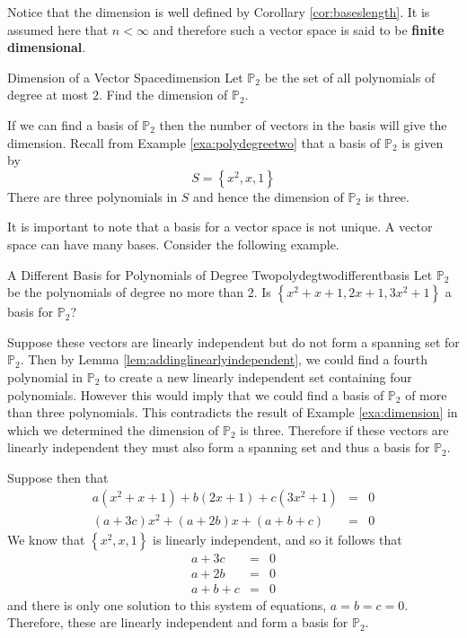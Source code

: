 Notice that the dimension is well defined by Corollary \ref{cor:baseslength}. It is assumed here
that $n<\infty $ and therefore such a vector space is said to be \textbf{finite
dimensional}.

\begin{example}{Dimension of a Vector Space}{dimension}
Let $\mathbb{P}_2$ be the set of all polynomials of degree at most $2$. Find the dimension of $\mathbb{P}_2$. 
\end{example}

\begin{solution}
If we can find a basis of $\mathbb{P}_2$ then the number of vectors in the basis will give the dimension. Recall from Example \ref{exa:polydegreetwo} that a basis of $\mathbb{P}_2$ is given by 
\[
S  = \left\{ x^2, x, 1 \right\}
\]
There are three polynomials in $S$ and hence the dimension of $\mathbb{P}_2$ is three. 
\end{solution}

It is important to note that a basis for a vector space is not unique. A vector space can have many bases. Consider the following example.

\begin{example}{A Different Basis for Polynomials of Degree Two}{polydegtwodifferentbasis}
Let $\mathbb{P}_2$ be the polynomials of degree no more than 2. Is $\left\{
x^{2}+x+1,2x+1,3x^{2}+1\right\} $ a basis for $\mathbb{P}_2$?
\end{example}

\begin{solution}
Suppose these vectors are linearly independent but do not form a spanning set for $\mathbb{P}_2$. Then by Lemma \ref{lem:addinglinearlyindependent}, we could find a fourth polynomial in $\mathbb{P}_2$ to create a new linearly independent 
set containing four polynomials. However this would imply that we could find a basis of $\mathbb{P}_2$ of more than three polynomials. This contradicts the result of Example \ref{exa:dimension} in which we determined the dimension of $\mathbb{P}_2$ is three.  Therefore if these vectors are linearly independent they must also form a spanning set and thus a basis for $\mathbb{P}_2$. 

Suppose then that 
\begin{eqnarray*}
a\left( x^{2}+x+1\right) +b\left( 2x+1\right) +c\left( 3x^{2}+1\right) &=& 0\\
\left( a+3c\right) x^{2}+\left( a+2b\right) x+\left( a+b+c\right) &=& 0 
\end{eqnarray*}
We know that $\left\{ x^2, x, 1 \right\}$ is linearly independent, and so it follows that  
\begin{eqnarray*}
a+3c &=& 0 \\
a+2b &=& 0 \\
a+b+c &=& 0
\end{eqnarray*}
and there is only one solution to this system of equations, $a=b=c=0$.
Therefore, these are linearly independent and form a basis for $\mathbb{P}_2$.
\end{solution}

